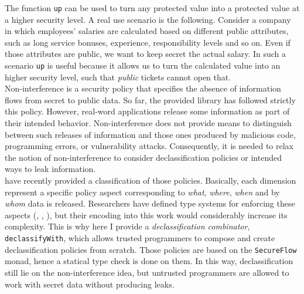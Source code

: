 The function \texttt{up} can be used to turn any protected value into a protected value at a higher security level. A real use scenario is the following. Consider a company in which employees' salaries are calculated based on different public attributes, such as long service bonuses, experience, responsibility levels and so on. Even if those attributes are public, we want to keep secret the actual salary. In such a scenario \texttt{up} is useful because it allows us to turn the calculated value into an higher security level, such that \textit{public} tickets cannot open that. \\
Non-interference is a security policy that specifies the absence of information flows from secret to public data. So far, the provided library has followed strictly this policy. However, real-word applications release some information as part of their intended behavior. Non-interference does not provide means to distinguish between such releases of information and those ones produced by malicious code, programming errors, or vulnerability attacks. Consequently, it is needed to relax the notion of non-interference to consider declassification policies or intended ways to leak information. \\
\citeauthor{sabelfeld2005dimensions} \cite{sabelfeld2005dimensions} have recently provided a classification of those policies. Basically, each dimension represent a specific policy aspect corresponding to \textit{what}, \textit{where}, \textit{when} and by \textit{whom} data is released. Researchers have defined type systems for enforcing these aspects (\cite{banerjee2008expressive}, \cite{zdancewic2001robust}, \cite{zdancewic2003type}), but their encoding into this work would considerably increase its complexity. This is why here I provide a \textit{declassification combinator}, \texttt{declassifyWith}, which allows trusted programmers to compose and create declassification policies from scratch. Those policies are based on the \texttt{SecureFlow} monad, hence a statical type check is done on them. In this way, declassification still lie on the non-interference idea, but untrusted programmers are allowed to work with secret data without producing leaks.
